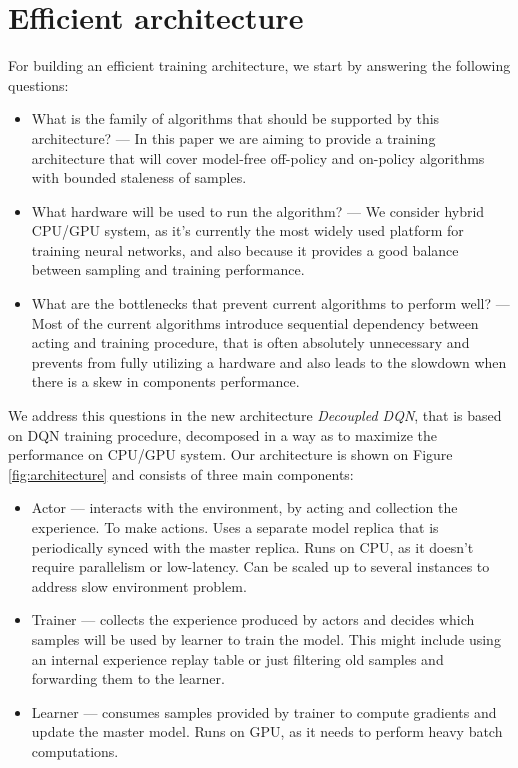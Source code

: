 \section{Efficient architecture}

For building an efficient training architecture, we start by answering the following questions:

\begin{itemize}
    \item What is the family of algorithms that should be supported by this architecture? --- In
    this paper we are aiming to provide a training architecture that will cover model-free
    off-policy and on-policy algorithms with bounded staleness of samples.

    \item What hardware will be used to run the algorithm? --- We consider hybrid CPU/GPU system,
    as it's currently the most widely used platform for training neural networks, and also because
    it provides a good balance between sampling and training performance.

    \item What are the bottlenecks that prevent current algorithms to perform well? --- Most of the
    current algorithms introduce sequential dependency between acting and training procedure, that
    is often absolutely unnecessary and prevents from fully utilizing a hardware and also leads to the
    slowdown when there is a skew in components performance.
\end{itemize}

We address this questions in the new architecture \emph{Decoupled DQN}, that is based on DQN
training procedure, decomposed in a way as to maximize the performance on CPU/GPU system.
Our architecture is shown on Figure \ref{fig:architecture} and consists of three main components:
\begin{itemize}
    \item Actor --- interacts with the environment, by acting and collection the experience. To
        make actions. Uses a separate model replica that is periodically synced with the master replica.
        Runs on CPU, as it doesn't require parallelism or low-latency. Can be scaled up to several
        instances to address slow environment problem.

    \item Trainer --- collects the experience produced by actors and decides which samples will be
        used by learner to train the model. This might include using an internal experience replay
        table or just filtering old samples and forwarding them to the learner.

    \item Learner --- consumes samples provided by trainer to compute gradients and update the
        master model. Runs on GPU, as it needs to perform heavy batch computations.
\end{itemize}

